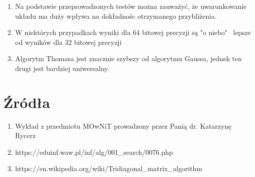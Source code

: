 \documentclass{article}
\begin{document}
\begin{enumerate}
    \item Na podstawie przeprowadzonych testów można zauważyć, że uwarunkowanie układu ma duży wpływa na dokładnośc otrzymanego przybliżenia.
    \item W niektórych przypadkach wyniki dla 64 bitowej precyzji są "o niebo" \ lepsze od wyników dla 32 bitowej precyzji
    \item Algorytm Thomasa jest znacznie szybszy od algorytmu Gaussa, jednek ten drugi jest bardziej uniwersalny.
\end{enumerate}

\section{Źródła}

\begin{enumerate}
    \item Wykład z przedmiotu MOwNiT prowadzony przez Panią dr. Katarzynę Rycerz
    \item https://eduinf.waw.pl/inf/alg/001\_search/0076.php
    \item https://en.wikipedia.org/wiki/Tridiagonal\_matrix\_algorithm
\end{enumerate}
\end{document}
